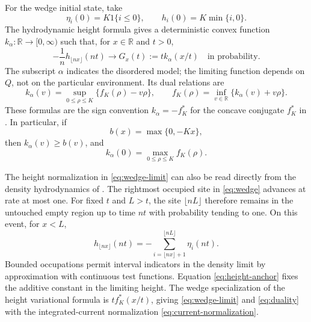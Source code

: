 \documentclass[11pt]{amsart}
\theoremstyle{remark}
\newcommand{\RR}{\mathbb R}
\numberwithin{equation}{section}
\begin{document}
For the wedge initial state, take
\begin{equation}\label{eq:wedge}
 \eta_i(0)=K\mathrm{1}\{i\leq0\},\qquad
 h_i(0)=K\min\{i,0\}.
\end{equation}
The hydrodynamic height formula gives a deterministic convex function
$k_\alpha:\RR\to[0,\infty)$ such that, for $x\in\RR$ and $t>0$,
\begin{equation}\label{eq:wedge-limit}
 -\frac1n h_{\lfloor nx\rfloor}(nt)
 \to G_x(t):=t k_\alpha(x/t)
 \quad\text{in probability}.
\end{equation}
The subscript $\alpha$ indicates the disordered model; the limiting
function depends on $Q$, not on the particular environment. Its dual
relations are
\begin{equation}\label{eq:duality}
 k_\alpha(v)=\sup_{0\leq\rho\leq K}\{f_K(\rho)-v\rho\},\qquad
 f_K(\rho)=\inf_{v\in\RR}\{k_\alpha(v)+v\rho\}.
\end{equation}
These formulas are the sign convention $k_\alpha=-f_K^*$ for the
concave conjugate $f_K^*$ in \cite[equation (3.2)]{SeppSurvey}.
In particular, if
\begin{equation}\label{eq:boundary}
 b(x)=\max\{0,-Kx\},
\end{equation}
then $k_\alpha(v)\geq b(v)$, and
\begin{equation}\label{eq:central-duality}
 k_\alpha(0)=\max_{0\leq\rho\leq K}f_K(\rho).
\end{equation}

The height normalization in \eqref{eq:wedge-limit} can also be read
directly from the density hydrodynamics of
\cite[Theorem 3]{SeppSurvey}. The rightmost occupied site in
\eqref{eq:wedge} advances at rate at most one. For fixed $t$ and $L>t$,
the site $\lfloor nL\rfloor$ therefore remains in the untouched empty
region up to time $nt$ with probability tending to one. On this event,
for $x<L$,
\begin{equation}\label{eq:height-anchor}
 h_{\lfloor nx\rfloor}(nt)
 =-\sum_{i=\lfloor nx\rfloor+1}^{\lfloor nL\rfloor}\eta_i(nt).
\end{equation}
Bounded occupations permit interval indicators in the density limit by
approximation with continuous test functions. Equation
\eqref{eq:height-anchor} fixes the additive constant in the limiting
height. The wedge specialization of the height variational formula is
$t f_K^*(x/t)$, giving \eqref{eq:wedge-limit} and
\eqref{eq:duality} with the integrated-current normalization
\eqref{eq:current-normalization}.
\end{document}
